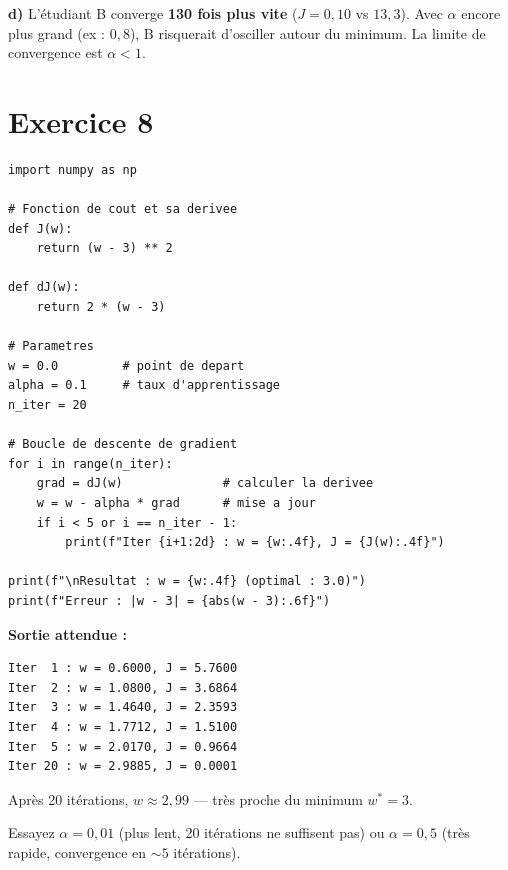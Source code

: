 \textbf{d)} L'\'{e}tudiant B converge \textbf{130 fois plus vite} ($J = 0{,}10$ vs $13{,}3$).
Avec $\alpha$ encore plus grand (ex : $0{,}8$), B risquerait d'osciller autour du minimum.
La limite de convergence est $\alpha < 1$.

\section*{Exercice 8 \hfill \exointermediaire}

\separateur

\begin{pythonbox}
\begin{lstlisting}
import numpy as np

# Fonction de cout et sa derivee
def J(w):
    return (w - 3) ** 2

def dJ(w):
    return 2 * (w - 3)

# Parametres
w = 0.0         # point de depart
alpha = 0.1     # taux d'apprentissage
n_iter = 20

# Boucle de descente de gradient
for i in range(n_iter):
    grad = dJ(w)              # calculer la derivee
    w = w - alpha * grad      # mise a jour
    if i < 5 or i == n_iter - 1:
        print(f"Iter {i+1:2d} : w = {w:.4f}, J = {J(w):.4f}")

print(f"\nResultat : w = {w:.4f} (optimal : 3.0)")
print(f"Erreur : |w - 3| = {abs(w - 3):.6f}")
\end{lstlisting}
\end{pythonbox}

\textbf{Sortie attendue :}
\begin{verbatim}
Iter  1 : w = 0.6000, J = 5.7600
Iter  2 : w = 1.0800, J = 3.6864
Iter  3 : w = 1.4640, J = 2.3593
Iter  4 : w = 1.7712, J = 1.5100
Iter  5 : w = 2.0170, J = 0.9664
Iter 20 : w = 2.9885, J = 0.0001
\end{verbatim}

Apr\`{e}s 20 it\'{e}rations, $w \approx 2{,}99$ --- tr\`{e}s proche du minimum $w^* = 3$.

\begin{intuitionbox}[Variante]
    Essayez $\alpha = 0{,}01$ (plus lent, 20 it\'{e}rations ne suffisent pas) ou $\alpha = 0{,}5$ (tr\`{e}s rapide, convergence en ${\sim}5$ it\'{e}rations).
\end{intuitionbox}

